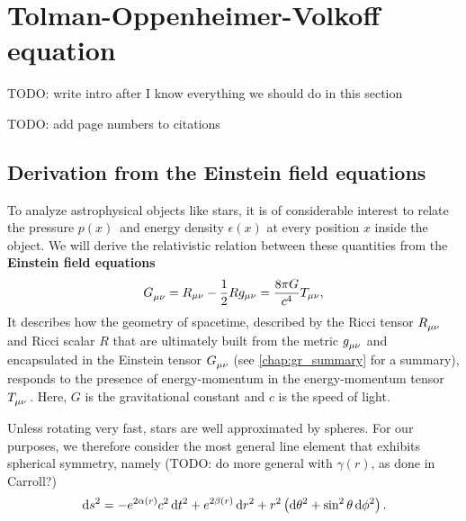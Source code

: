 \chapter{Tolman-Oppenheimer-Volkoff equation}

TODO: write intro after I know everything we should do in this section

TODO: add page numbers to citations

\section{Derivation from the Einstein field equations}
\label{sec:tov}

To analyze astrophysical objects like stars, it is of considerable interest to relate the pressure $p(x)$ and energy density $\epsilon(x)$ at every position $x$ inside the object.
We will derive the relativistic relation between these quantities from the \textbf{Einstein field equations} \cite[equation 4.44]{ref:carroll}
\begin{equation}
	G\indices{_\mu_\nu} = R_{\mu \nu} - \frac{1}{2} R g_{\mu \nu} = \frac{8 \pi G}{c^4} T_{\mu \nu} ,
	\label{eq:einstein}
\end{equation}
It describes how the geometry of spacetime, described by the Ricci tensor $R\indices{_\mu_\nu}$ and Ricci scalar $R$ that are ultimately built from the metric $g\indices{_\mu_\nu}$ and encapsulated in the Einstein tensor $G\indices{_\mu_\nu}$ (see \cref{chap:gr_summary} for a summary), responds to the presence of energy-momentum in the energy-momentum tensor $T\indices{_\mu_\nu}$.
Here, $G$ is the gravitational constant and $c$ is the speed of light.

Unless rotating very fast, stars are well approximated by spheres.
For our purposes, we therefore consider the most general line element that exhibits spherical symmetry, namely \cite[§ 94-95]{ref:tolman}
(TODO: do more general with $\gamma(r)$, as done in Carroll?)
\begin{equation}
	\mathop{}\!\mathrm{d} s^2 = -e^{2 \alpha(r)} c^2 \mathop{}\!\mathrm{d} t^2 + e^{2 \beta(r)} \mathop{}\!\mathrm{d} r^2 + r^2 \left( \mathop{}\!\mathrm{d} \theta^2 + \sin^2 \theta \mathop{}\!\mathrm{d} \phi^2 \right) .
\end{equation}

